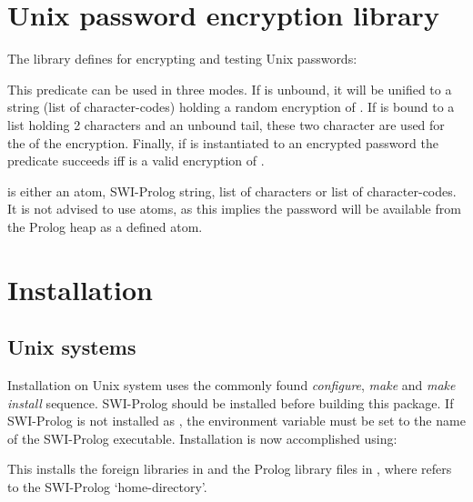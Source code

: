 \documentclass[11pt]{article}
\begin{document}
\section{Unix password encryption library}

The  library defines  for encrypting and testing
Unix passwords:

\begin{description}
This predicate can be used in three modes.  If  is
unbound, it will be unified to a string (list of character-codes)
holding a random encryption of .  If 
is bound to a list holding 2 characters and an unbound tail, these
two character are used for the  of the encryption. Finally,
if  is instantiated to an encrypted password the
predicate succeeds iff  is a valid encryption of
.

 is either an atom, SWI-Prolog string, list of characters
or list of character-codes.  It is not advised to use atoms, as this
implies the password will be available from the Prolog heap as a
defined atom.
\end{description}

\section{Installation}

\subsection{Unix systems}

Installation on Unix system uses the commonly found {\em configure},
{\em make} and {\em make install} sequence. SWI-Prolog should be
installed before building this package. If SWI-Prolog is not installed
as , the environment variable  must be set to the
name of the SWI-Prolog executable. Installation is now accomplished
using:

\begin{code}
\end{code}

\noindent
This installs the foreign libraries in  and
the Prolog library files in , where
 refers to the SWI-Prolog `home-directory'.
\end{document}
